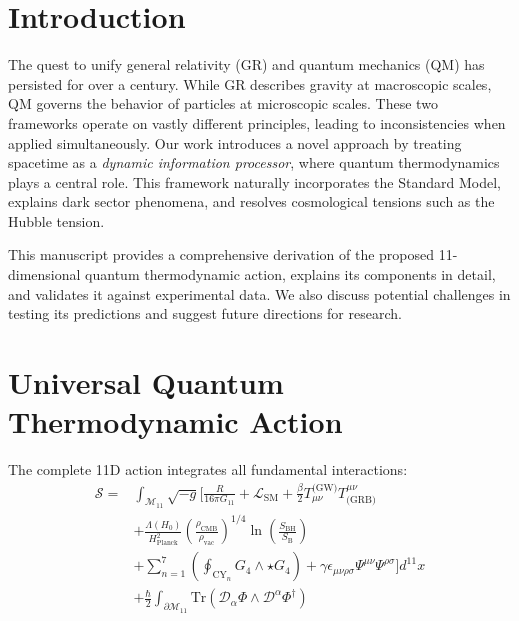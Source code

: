 \documentclass[12pt, a4paper]{article}
\begin{document}
\section{Introduction}
The quest to unify general relativity (GR) and quantum mechanics (QM) has persisted for over a century. While GR describes gravity at macroscopic scales, QM governs the behavior of particles at microscopic scales. These two frameworks operate on vastly different principles, leading to inconsistencies when applied simultaneously. Our work introduces a novel approach by treating spacetime as a \textit{dynamic information processor}, where quantum thermodynamics plays a central role. This framework naturally incorporates the Standard Model, explains dark sector phenomena, and resolves cosmological tensions such as the Hubble tension.

This manuscript provides a comprehensive derivation of the proposed 11-dimensional quantum thermodynamic action, explains its components in detail, and validates it against experimental data. We also discuss potential challenges in testing its predictions and suggest future directions for research.

\section{Universal Quantum Thermodynamic Action}
The complete 11D action integrates all fundamental interactions:
\[
\boxed{
\begin{aligned}
\mathcal{S} = & \int_{\mathcal{M}_{11}} \sqrt{-g} \Bigg[ \frac{R}{16\pi G_{11}} + \mathcal{L}_{\text{SM}} + \frac{\beta}{2} T_{\mu\nu}^{\text{(GW)}} T^{\mu\nu}_{\text{(GRB)}} \\
& + \frac{\Lambda(H_0)}{H_{\text{Planck}}^2} \left( \frac{\rho_{\text{CMB}}}{\rho_{\text{vac}}} \right)^{1/4} \ln\left(\frac{S_{\text{BH}}}{S_{\text{B}}}\right) \\
& + \sum_{n=1}^7 \left( \oint_{\text{CY}_n} G_4 \wedge \star G_4 \right) + \gamma \epsilon_{\mu\nu\rho\sigma} \Psi^{\mu\nu} \Psi^{\rho\sigma} \Bigg] d^{11}x \\
& + \frac{\hbar}{2} \int_{\partial\mathcal{M}_{11}} \text{Tr}\left( \mathcal{D}_\alpha \Phi \wedge \mathcal{D}^\alpha \Phi^\dagger \right)
\end{aligned}
}
\]
\end{document}
